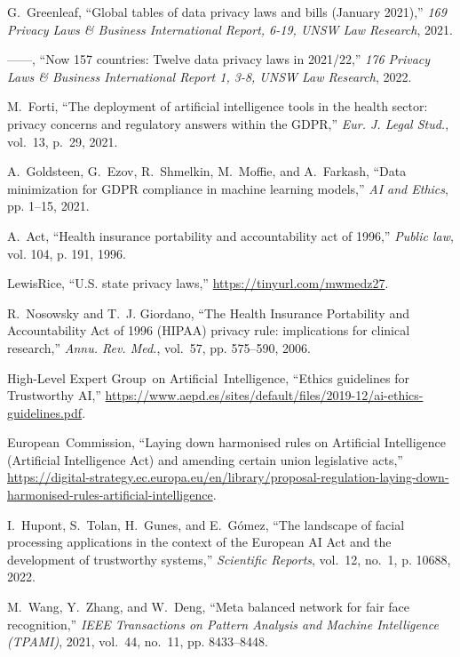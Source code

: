 \documentclass[journal]{IEEEtran}
\begin{document}
\begin{thebibliography}{100}
G.~Greenleaf, ``Global tables of data privacy laws and bills (January 2021),''
\emph{169 Privacy Laws \& Business International Report, 6-19, UNSW Law
Research}, 2021.

------, ``Now 157 countries: Twelve data privacy laws in 2021/22,'' \emph{176
Privacy Laws \& Business International Report 1, 3-8, UNSW Law Research},
2022.

M.~Forti, ``The deployment of artificial intelligence tools in the health
sector: privacy concerns and regulatory answers within the GDPR,'' \emph{Eur.
J. Legal Stud.}, vol.~13, p.~29, 2021.

A.~Goldsteen, G.~Ezov, R.~Shmelkin, M.~Moffie, and A.~Farkash, ``Data
minimization for GDPR compliance in machine learning models,'' \emph{AI and
Ethics}, pp. 1--15, 2021.

A.~Act, ``Health insurance portability and accountability act of 1996,''
\emph{Public law}, vol. 104, p. 191, 1996.

\relax LewisRice, ``U.S. state privacy laws,''
\url{https://tinyurl.com/mwmedz27}.

R.~Nosowsky and T.~J. Giordano, ``The Health Insurance Portability and
Accountability Act of 1996 (HIPAA) privacy rule: implications for clinical
research,'' \emph{Annu. Rev. Med.}, vol.~57, pp. 575--590, 2006.

\relax High-Level Expert Group~on Artificial~Intelligence, ``Ethics guidelines
for Trustworthy AI,''
\url{https://www.aepd.es/sites/default/files/2019-12/ai-ethics-guidelines.pdf}.

\relax European~Commission, ``Laying down harmonised rules on Artificial Intelligence (Artificial Intelligence Act) and amending certain union legislative acts,''
\url{https://digital-strategy.ec.europa.eu/en/library/proposal-regulation-laying-down-harmonised-rules-artificial-intelligence}.

I.~Hupont, S.~Tolan, H.~Gunes, and E.~G{\'o}mez, ``The landscape of facial
processing applications in the context of the European AI Act and the development of trustworthy systems,'' \emph{Scientific Reports}, vol.~12,
no.~1, p. 10688, 2022.

M.~Wang, Y.~Zhang, and W.~Deng, ``Meta balanced network for fair face recognition,'' \emph{IEEE Transactions on Pattern Analysis and Machine Intelligence (TPAMI)}, 2021, vol.~44, no.~11, pp. 8433--8448.


\end{thebibliography}
\end{document}
